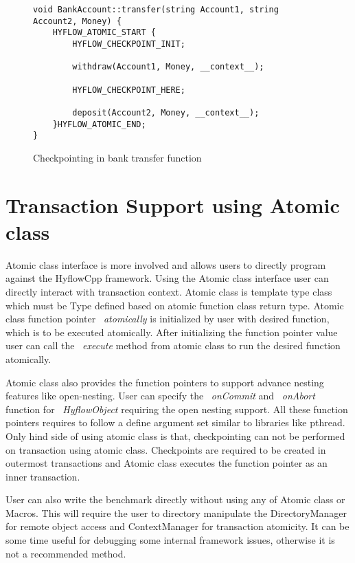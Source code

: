 \documentclass[12pt,english]{report}
\begin{document}
\begin{figure}
\begin{minipage}[b]{0.9\linewidth}\centering
\begin{lstlisting}
void BankAccount::transfer(string Account1, string Account2, Money) {
	HYFLOW_ATOMIC_START {
		HYFLOW_CHECKPOINT_INIT;

		withdraw(Account1, Money, __context__);

		HYFLOW_CHECKPOINT_HERE;
	
		deposit(Account2, Money, __context__);
	}HYFLOW_ATOMIC_END;
}
\end{lstlisting}
\end{minipage}
\caption{Checkpointing in bank transfer function}
\label{Fig:bankCP}
\end{figure}

\section{Transaction Support using Atomic class}

Atomic class interface is more involved and allows users to directly program against the HyflowCpp framework. Using the Atomic class interface user can directly interact with transaction context. Atomic class is template type class which must be Type defined based on atomic function class return type. Atomic class function pointer ~\emph{atomically} is initialized by user with desired function, which is to be executed atomically. After initializing the function pointer value user can call the ~\emph{execute} method from atomic class to run the desired function atomically.

Atomic class also provides the function pointers to support advance nesting features like open-nesting. User can specify the ~\emph{onCommit} and ~\emph{onAbort} function for  ~\emph{HyflowObject} requiring the open nesting support. All these function pointers requires to follow a define argument set similar to libraries like pthread. Only hind side of using atomic class is that, checkpointing can not be performed on transaction using atomic class. Checkpoints are required to be created in outermost transactions and Atomic class executes the function pointer as an inner transaction. 

User can also write the benchmark directly without using any of Atomic class or Macros. This will require the user to directory manipulate the DirectoryManager for remote object access and ContextManager for transaction atomicity. It can be some time useful for debugging some internal framework issues, otherwise it is not a recommended method.
\end{document}

